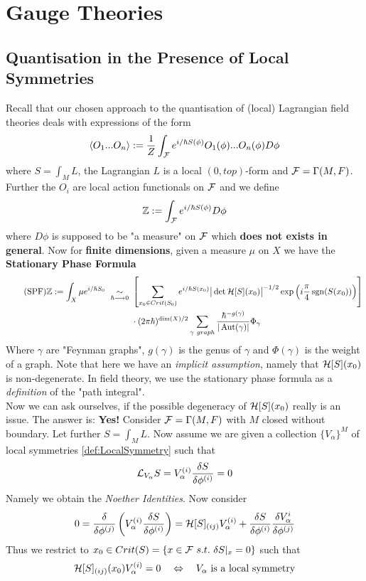 \section{Gauge Theories}
\label{sec:Gauge_Theories}

\subsection{Quantisation in the Presence of Local Symmetries}

Recall that our chosen approach to the quantisation of (local) Lagrangian field theories deals with expressions of the form
$$ \langle O_1 ... O_n \rangle := \frac{1}{Z} \int_\FF e^{i/\hbar S(\phi)} O_1(\phi) ... O_n(\phi) D\phi $$
where $S = \int_M L$, the Lagrangian $L$ is a local $(0,top)$-form and ${\mathcal{F}} = \Gamma(M, F)$. Further the $O_i$ are local action functionals on ${\mathcal{F}}$ and we define
$$ \ZZ := \int_\FF e^{i/\hbar S(\phi)} D\phi $$
where $D\phi$ is supposed to be "a measure" on ${\mathcal{F}}$ which \textbf{does not exists in general}. Now for \textbf{finite dimensions}, given a measure $\mu$ on $X$ we have the \textbf{Stationary Phase Formula}
\begin{align*}\label{eq:StatPhase}\tag{SPF}
  \ZZ := \int_X \mu e^{i/\hbar S_0} \ \underset{\hbar \lra 0}{\sim} \ &\left[ \sum_{x_0 \in Crit(S_0)} e^{i/\hbar S(x_0)} \big|\det\HH[S](x_0)\big|^{-1/2} \exp\left(i \frac{\pi}{4} \sgn(S(x_0))\right) \right]\\
   &\cdot (2\pi \hbar)^{\dim(X)/2} \sum_{\gamma \ graph} \frac{\hbar^{-g(\gamma)}}{|\Aut(\gamma)|} \Phi_\gamma
\end{align*}
Where $\gamma$ are "Feynman graphs", $g(\gamma)$ is the genus of $\gamma$ and $\Phi(\gamma)$ is the weight of a graph. Note that here we have an \emph{implicit assumption}, namely that ${\mathcal{H}}[S](x_0)$ is non-degenerate. In field theory, we use the stationary phase formula as a \emph{definition} of the "path integral".\\

Now we can ask ourselves, if the possible degeneracy of ${\mathcal{H}}[S](x_0)$ really is an issue. The answer is: \textbf{Yes!} Consider ${\mathcal{F}} = \Gamma(M, F)$ with $M$ closed without boundary. Let further $S = \int_M L$. Now assume we are given a collection $\{V_\alpha\}^M$ of local symmetries \ref{def:LocalSymmetry} such that
$$ \lie{V_\alpha} S = V_\alpha^{(i)} \frac{\delta S}{\delta \phi^{(i)}} = 0 $$
Namely we obtain the \emph{Noether Identities}. Now consider
\begin{align*}
  0 = \frac{\delta}{\delta \phi^{(j)}} \left( V_\alpha^{(i)} \frac{\delta S}{\delta \phi^{(i)}} \right) = \HH[S]_{(ij)} V^{(i)}_\alpha + \frac{\delta S}{\delta \phi^{(i)}} \frac{\delta V_\alpha^i}{\delta \phi^{(j)}}
\end{align*}
Thus we restrict to $x_0 \in Crit(S) = \{x \in {\mathcal{F}} \ s.t. \ \delta S|_x = 0\}$ such that
$$ {\mathcal{H}}[S]_{(ij)}(x_0) V^{(i)}_\alpha = 0 \quad \Leftrightarrow \quad V_\alpha \ \text{is a local symmetry} $$

